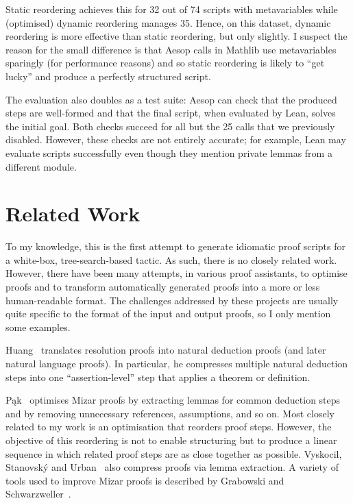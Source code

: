 \documentclass[sigplan,screen]{acmart}
\begin{document}
Static reordering achieves this for 32 out of 74 scripts with metavariables while (optimised) dynamic reordering manages 35.
Hence, on this dataset, dynamic reordering is more effective than static reordering, but only slightly.
I suspect the reason for the small difference is that Aesop calls in Mathlib use metavariables sparingly (for performance reasons) and so static reordering is likely to \enquote{get lucky} and produce a perfectly structured script.

\medskip

The evaluation also doubles as a test suite: Aesop can check that the produced steps are well-formed and that the final script, when evaluated by Lean, solves the initial goal.
Both checks succeed for all but the 25 calls that we previously disabled.
However, these checks are not entirely accurate; for example, Lean may evaluate scripts successfully even though they mention private lemmas from a different module.

\section{Related Work}%
\label{sec:related}

To my knowledge, this is the first attempt to generate idiomatic proof scripts for a white-box, tree-search-based tactic.
As such, there is no closely related work.
However, there have been many attempts, in various proof assistants, to optimise proofs and to transform automatically generated proofs into a more or less human-readable format.
The challenges addressed by these projects are usually quite specific to the format of the input and output proofs, so I only mention some examples.

Huang~\cite{Huang1989,Huang1994,Huang1996} translates resolution proofs into natural deduction proofs (and later natural language proofs).
In particular, he compresses multiple natural deduction steps into one \enquote{assertion-level} step that applies a theorem or definition.

Pąk~\cite{Pak2015,Pak2014a,Pak2014b,Pak2013,Pak2010} optimises Mizar proofs by extracting lemmas for common deduction steps and by removing unnecessary references, assumptions, and so on.
Most closely related to my work is an optimisation that reorders proof steps.
However, the objective of this reordering is not to enable structuring but to produce a linear sequence in which related proof steps are as close together as possible.
Vyskocil, Stanovský and Urban~\cite{Vyskovil2010} also compress proofs via lemma extraction.
A variety of tools used to improve Mizar proofs is described by Grabowski and Schwarzweller~\cite{Grabowski2009}.
\end{document}

